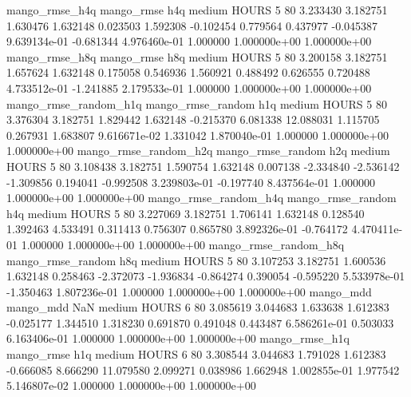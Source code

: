        mango_rmse_h4q        mango_rmse                  h4q     medium    HOURS                 5 80  3.233430       3.182751 1.630476       1.632148    0.023503      1.592308     -0.102454     0.779564       0.437977 -0.045387 9.639134e-01    -0.681344   4.976460e-01            1.000000    1.000000e+00        1.000000e+00
       mango_rmse_h8q        mango_rmse                  h8q     medium    HOURS                 5 80  3.200158       3.182751 1.657624       1.632148    0.175058      0.546936      1.560921     0.488492       0.626555  0.720488 4.733512e-01    -1.241885   2.179533e-01            1.000000    1.000000e+00        1.000000e+00
mango_rmse_random_h1q mango_rmse_random                  h1q     medium    HOURS                 5 80  3.376304       3.182751 1.829442       1.632148   -0.215370      6.081338     12.088031     1.115705       0.267931  1.683807 9.616671e-02     1.331042   1.870040e-01            1.000000    1.000000e+00        1.000000e+00
mango_rmse_random_h2q mango_rmse_random                  h2q     medium    HOURS                 5 80  3.108438       3.182751 1.590754       1.632148    0.007138     -2.334840     -2.536142    -1.309856       0.194041 -0.992508 3.239803e-01    -0.197740   8.437564e-01            1.000000    1.000000e+00        1.000000e+00
mango_rmse_random_h4q mango_rmse_random                  h4q     medium    HOURS                 5 80  3.227069       3.182751 1.706141       1.632148    0.128540      1.392463      4.533491     0.311413       0.756307  0.865780 3.892326e-01    -0.764172   4.470411e-01            1.000000    1.000000e+00        1.000000e+00
mango_rmse_random_h8q mango_rmse_random                  h8q     medium    HOURS                 5 80  3.107253       3.182751 1.600536       1.632148    0.258463     -2.372073     -1.936834    -0.864274       0.390054 -0.595220 5.533978e-01    -1.350463   1.807236e-01            1.000000    1.000000e+00        1.000000e+00
            mango_mdd         mango_mdd                  NaN     medium    HOURS                 6 80  3.085619       3.044683 1.633638       1.612383   -0.025177      1.344510      1.318230     0.691870       0.491048  0.443487 6.586261e-01     0.503033   6.163406e-01            1.000000    1.000000e+00        1.000000e+00
       mango_rmse_h1q        mango_rmse                  h1q     medium    HOURS                 6 80  3.308544       3.044683 1.791028       1.612383   -0.666085      8.666290     11.079580     2.099271       0.038986  1.662948 1.002855e-01     1.977542   5.146807e-02            1.000000    1.000000e+00        1.000000e+00
